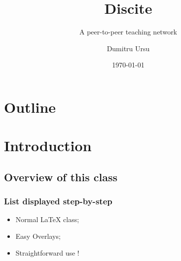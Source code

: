 \documentclass{beamer}
\title{Discite}
\subtitle{A peer-to-peer teaching network}
\author{Dumitru Ursu}
\date{\today}
\begin{document}
\frame{\titlepage}
\section*{Outline}
\frame{\tableofcontents}

\section{Introduction}
\subsection{Overview of this class}
\frame
{
  \frametitle{List displayed step-by-step}

  \begin{itemize}
    \item<1-> Normal LaTeX class;
    \item<2-> Easy Overlays;
    \item<3-> Straightforward use !
  \end{itemize}
}
\end{document}

